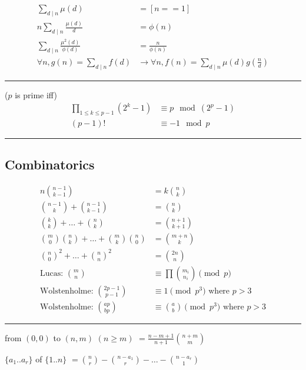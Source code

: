 \documentclass[10pt,letterpaper,landscape]{article}
\begin{document}
\begin{multicols}{2}
\begin{align*}
	\sum_{d \mid n}{\mu(d)} &= [n==1] \\
	n \sum_{d \mid n}{\frac{\mu(d)}{d}} &= \phi(n) \\
	\sum_{d \mid n}{\frac{\mu^2(d)}{\phi(d)}} &= \frac{n}{\phi(n)} \\
	\forall n, g(n) = \sum_{d \mid n}{f(d)} &\rightarrow \forall n, f(n) = \sum_{d \mid n}{\mu(d) g(\frac{n}{d})} %
\end{align*}

\noindent\rule{\linewidth}{1pt}

 ($p$ is prime iff)
\begin{align*}
	\prod_{1 \le k \le p-1}{(2^k - 1)} &\equiv p \mod{(2^p - 1)} \\ %
	(p-1)! &\equiv -1 \mod{p} %
\end{align*}

\noindent\rule{\linewidth}{1pt}

\subsection{Combinatorics}

\begin{align*}
	n \binom{n-1}{k-1} &= k \binom{n}{k} \\
	\binom{n-1}{k} + \binom{n-1}{k-1} &= \binom{n}{k} \\
	\binom{k}{k} + \hdots + \binom{n}{k} &= \binom{n+1}{k+1} \\
	\binom{m}{0} \binom{n}{k} + \hdots + \binom{m}{k} \binom{n}{0} &= \binom{m+n}{k} \\
	\binom{n}{0}^2 + \hdots + \binom{n}{n}^2 &= \binom{2n}{n} \\
	\text{Lucas: } \binom{m}{n} &\equiv \prod{\binom{m_i}{n_i}} \pmod{p} \\
	\text{Wolstenholme: } \binom{2p-1}{p-1} &\equiv 1 \pmod{p^3} \text{ where } p > 3 \\
	\text{Wolstenholme: } \binom{ap}{bp} &\equiv \binom{a}{b} \pmod{p^3} \text{ where } p > 3
\end{align*}

\noindent\rule{\linewidth}{1pt}

 from $(0,0)$ to $(n,m)$ $(n \ge m)$ $= \frac{n-m+1}{n+1} \binom{n+m}{m}$

 $\{a_1 .. a_r\}$ of $\{1 .. n\}$ $= \binom{n}{r} - \binom{n-a_1}{r} - \hdots - \binom{n-a_r}{1}$


\end{multicols}
\end{document}
